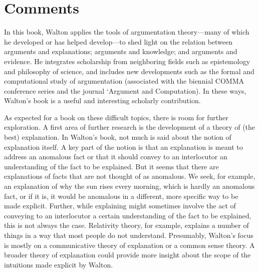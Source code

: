 \documentclass[12pt]{article}
\begin{document}
\section{Comments}
\label{comments}

\noindent %
In this book, Walton applies the tools of argumentation theory---many of which he developed or has helped develop---to shed light on 
the relation between arguments and explanations; arguments and knowledge;
and arguments and evidence. 
He integrates scholarship from neighboring fields such as epistemology and philosophy of science, and includes 
new developments such as the formal and computational study of argumentation (associated with the biennial COMMA conference series 
and the journal `Argument and Computation). In these ways, Walton's book is a useful and interesting scholarly contribution.

As expected for a book on these difficult topics, there is room for further exploration. A first area of further research is the development of a theory of (the
best) explanation. In Walton's book, not much is said about the notion of
explanation itself. A key part of the notion is that an
explanation is meant to address an anomalous fact or that it should
convey to an interlocutor an understanding of the fact to be
explained. But it seems that there are explanations of facts that are not thought of as anomalous. We seek, for example, an
explanation of why the sun rises every morning, which is hardly an
anomalous fact, or if it is, it would be
anomalous in a different, more specific way to be made explicit. Further, while explaining might sometimes
involve the act of conveying to an interlocutor a certain
understanding of the fact to be explained, this is not always the
case. Relativity theory, for example, explains a number of things in a
way that most people do not understand. Presumably, Walton's focus is mostly on a
communicative theory of explanation or a common sense theory. A broader theory of explanation 
could provide more insight about the scope of the intuitions made explicit by Walton.
\end{document}
